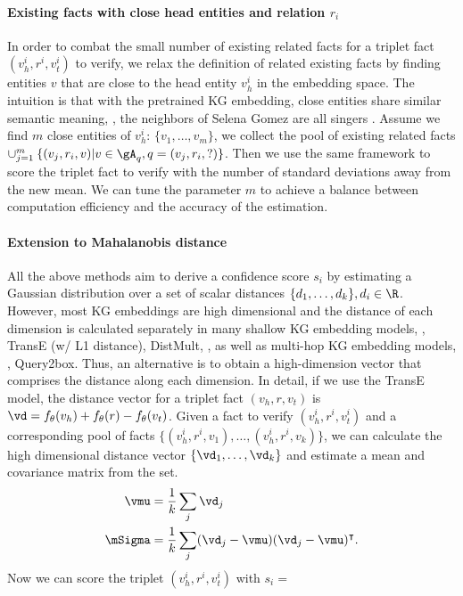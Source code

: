 \paragraph{Existing facts with close head entities and relation $r_i$}
In order to combat the small number of existing related facts for a triplet fact $(v_h^i, r^i, v_t^i)$ to verify, we relax the definition of related existing facts by finding entities $v$ that are close to the head entity $v_h^i$ in the embedding space. The intuition is that with the pretrained KG embedding, close entities share similar semantic meaning, \eg, the neighbors of Selena Gomez are all singers . Assume we find $m$ close entities of $v_h^i$: $\{v_1, \dots, v_m\}$, we collect the pool of existing related facts $\cup_{j=1}^m\:\{(v_j, r_i, v) | v\in\gA_q, q=(v_j, r_i, ?)\}$. Then we use the same framework to score the triplet fact to verify with the number of standard deviations away from the new mean. We can tune the parameter $m$ to achieve a balance between computation efficiency and the accuracy of the estimation.

\paragraph{Extension to Mahalanobis distance}
All the above methods aim to derive a confidence score $s_i$ by estimating a Gaussian distribution over a set of scalar distances $\{d_1, \dots, d_k\}, d_i\in\R$. However, most KG embeddings are high dimensional and the distance of each dimension is calculated separately in many shallow KG embedding models, \eg, TransE (w/ L1 distance), DistMult, \etc, as well as multi-hop KG embedding models, \eg, Query2box. Thus, an alternative is to obtain a high-dimension vector that comprises the distance along each dimension. In detail, if we use the TransE model, the distance vector for a triplet fact $(v_h, r, v_t)$ is $\vd=f_\theta(v_h)+f_\theta(r)-f_\theta(v_t)$. Given a fact to verify $(v_h^i, r^i, v_t^i)$ and a corresponding pool of facts $\{(v_h^i, r^i, v_1), \dots, (v_h^i, r^i, v_k)\}$, we can calculate the high dimensional distance vector $\{\vd_1, \dots, \vd_k\}$ and estimate a mean and covariance matrix from the set.
\begin{align}
    \vmu&=\frac{1}{k} \sum_j \vd_j \nonumber\\
    \mSigma&=\frac{1}{k} \sum_j (\vd_j - \vmu)(\vd_j - \vmu)^\intercal.
\end{align}
Now we can score the triplet $(v_h^i, r^i, v_t^i)$ with $s_i = $


